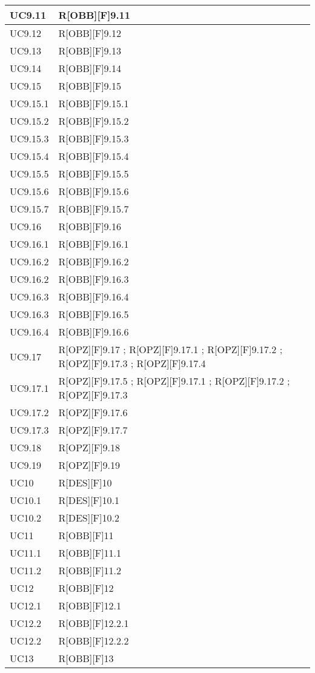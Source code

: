 	\begin{table}[H]
		\centering
		\begin{tabular}{|p{}|p{}|}
			\midrule

			UC9.11 & R[OBB][F]9.11 \\ \midrule
			UC9.12 & R[OBB][F]9.12 \\ \midrule
			UC9.13 & R[OBB][F]9.13 \\ \midrule
			UC9.14 & R[OBB][F]9.14 \\ \midrule
			UC9.15 & R[OBB][F]9.15 \\ \midrule
			UC9.15.1 & R[OBB][F]9.15.1 \\ \midrule
			UC9.15.2 & R[OBB][F]9.15.2 \\ \midrule
			UC9.15.3 & R[OBB][F]9.15.3 \\ \midrule
			UC9.15.4 & R[OBB][F]9.15.4 \\ \midrule
			UC9.15.5 & R[OBB][F]9.15.5 \\ \midrule
			UC9.15.6 & R[OBB][F]9.15.6 \\ \midrule
			UC9.15.7 & R[OBB][F]9.15.7 \\ \midrule
			UC9.16 & R[OBB][F]9.16 \\ \midrule
			UC9.16.1 & R[OBB][F]9.16.1 \\ \midrule
			UC9.16.2 & R[OBB][F]9.16.2 \\ \midrule
			UC9.16.2 & R[OBB][F]9.16.3 \\ \midrule
			UC9.16.3 & R[OBB][F]9.16.4 \\ \midrule
			UC9.16.3 & R[OBB][F]9.16.5 \\ \midrule
			UC9.16.4 & R[OBB][F]9.16.6 \\ \midrule
			UC9.17 & R[OPZ][F]9.17 ; R[OPZ][F]9.17.1 ; R[OPZ][F]9.17.2 ; R[OPZ][F]9.17.3 ; R[OPZ][F]9.17.4 \\ \midrule
			UC9.17.1 & R[OPZ][F]9.17.5 ; R[OPZ][F]9.17.1 ; R[OPZ][F]9.17.2 ; R[OPZ][F]9.17.3 \\ \midrule
			UC9.17.2 & R[OPZ][F]9.17.6 \\ \midrule
			UC9.17.3 & R[OPZ][F]9.17.7 \\ \midrule
			UC9.18 & R[OPZ][F]9.18 \\ \midrule
			UC9.19 & R[OPZ][F]9.19 \\ \midrule
			UC10 & R[DES][F]10 \\ \midrule			
			UC10.1 & R[DES][F]10.1 \\ \midrule
			UC10.2 & R[DES][F]10.2 \\ \midrule
			UC11 & R[OBB][F]11 \\ \midrule
			UC11.1 & R[OBB][F]11.1 \\ \midrule
			UC11.2 & R[OBB][F]11.2 \\ \midrule
			UC12 & R[OBB][F]12 \\ \midrule
			UC12.1 & R[OBB][F]12.1 \\ \midrule
			UC12.2 & R[OBB][F]12.2.1 \\ \midrule
			UC12.2 & R[OBB][F]12.2.2 \\ \midrule
			UC13 & R[OBB][F]13 \\
			

\end{tabular}
\end{table}
